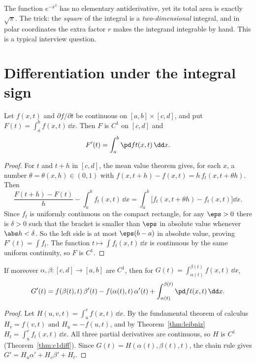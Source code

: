 \begin{intuition}
The function $e^{-x^2}$ has no elementary antiderivative, yet its total area is exactly $\sqrt\pi$. The trick: the \emph{square} of the integral is a \emph{two-dimensional} integral, and in polar coordinates the extra factor $r$ makes the integrand integrable by hand. This is a typical interview question.
\end{intuition}

\section{Differentiation under the integral sign}

\begin{theorem}\label{thm:leibniz}
Let $f(x,t)$ and $\partial f/\partial t$ be continuous on $[a,b]\times[c,d]$, and put $F(t)=\int_a^bf(x,t)\,\dd x$. Then $F$ is $C^1$ on $[c,d]$ and
\[
F'(t)=\int_a^b\pd ft(x,t)\,\dd x .
\]
\end{theorem}

\begin{proof}
For $t$ and $t+h$ in $[c,d]$, the mean value theorem gives, for each $x$, a number $\theta=\theta(x,h)\in(0,1)$ with $f(x,t+h)-f(x,t)=h\,f_t(x,t+\theta h)$. Then
\[
\frac{F(t+h)-F(t)}h-\int_a^bf_t(x,t)\,\dd x=\int_a^b\bigl[f_t(x,t+\theta h)-f_t(x,t)\bigr]\dd x .
\]
Since $f_t$ is uniformly continuous on the compact rectangle, for any $\eps>0$ there is $\delta>0$ such that the bracket is smaller than $\eps$ in absolute value whenever $\abs h<\delta$. So the left side is at most $\eps(b-a)$ in absolute value, proving $F'(t)=\int f_t$. The function $t\mapsto\int f_t(x,t)\,\dd x$ is continuous by the same uniform continuity, so $F$ is $C^1$.
\end{proof}

\begin{corollary}\label{cor:leibnizvar}
If moreover $\alpha,\beta:[c,d]\to[a,b]$ are $C^1$, then for $G(t)=\int_{\alpha(t)}^{\beta(t)}f(x,t)\,\dd x$,
\[
G'(t)=f(\beta(t),t)\,\beta'(t)-f(\alpha(t),t)\,\alpha'(t)+\int_{\alpha(t)}^{\beta(t)}\pd ft(x,t)\,\dd x .
\]
\end{corollary}

\begin{proof}
Let $H(u,v,t)=\int_u^vf(x,t)\,\dd x$. By the fundamental theorem of calculus $H_v=f(v,t)$ and $H_u=-f(u,t)$, and by Theorem~\ref{thm:leibniz} $H_t=\int_u^vf_t(x,t)\,\dd x$. All three partial derivatives are continuous, so $H$ is $C^1$ (Theorem~\ref{thm:c1diff}). Since $G(t)=H(\alpha(t),\beta(t),t)$, the chain rule gives $G'=H_u\alpha'+H_v\beta'+H_t$.
\end{proof}

